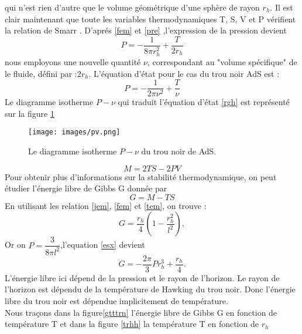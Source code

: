 \documentclass[12pt,  a4paper, openright]{report} %
\begin{document}
qui n’est rien d’autre que le volume géométrique d’une sphère de rayon $r_{h}$. Il est clair
maintenant que toute les variables thermodynamiques T, S, V et P vérifient la relation
de Smarr \cite{16} .
D'aprés \ref{fem} et \ref{pre} ,l'expression de la pression devient 
\begin{equation}
P=-\dfrac{1}{8\pi r_{h}^2}+\dfrac{T}{2r_{h}}
\end{equation}
nous employons une nouvelle quantité $\nu$, correspondant au "volume spécifique" de le fluide, défini par :$ 2r_{h}$. L'équation d'état pour le cas du trou noir AdS est \cite{18}:
\begin{equation}
\label{rgh}
P=-\dfrac{1}{2\pi \nu^2}+\dfrac{T}{\nu}
\end{equation}
Le diagramme isotherme $P-\nu$ qui traduit l'équation d'état \ref{rgh} est représenté  sur la figure \ref{pv}
\begin{figure}
	\begin{center}
	\texttt{[image: images/pv.png]}
	
	\caption{Le diagramme isotherme $P-\nu$ du trou noir de AdS. }
	\label{pv}
	\end{center}
	
\end{figure}

\begin{equation}
M=2TS-2PV
\end{equation}
Pour obtenir plus d'informations sur la stabilité thermodynamique, on peut étudier l'énergie libre de Gibbs G donnée par
\begin{equation}
G=M-TS
\end{equation}
En utilisant les relation \ref{jem}, \ref{fem} et \ref{tem}, on trouve :
\begin{equation}
\label{esx}
G=\dfrac{r_{h}}{4}(1-\dfrac{r_{h}^{2}}{l^{2}}),
\end{equation}
Or on $P=\dfrac{3}{8\pi l^{2}}$,l'equation \ref{esx} devient
\begin{equation}
G=-\dfrac{2\pi}{3}Pr_{h}^{3}+\dfrac{r_{h}}{4}.
\end{equation}
L’énergie libre ici dépend de la pression et le rayon de l’horizon. Le rayon de l’horizon est
dépendu de la température de Hawking du trou noir. Donc l’énergie libre du trou noir est
dépendue implicitement de température.\\
 Nous traçons dans la figure\ref{gtttrn} l’énergie libre de Gibbs G en fonction de température T et dans la figure \ref{trhh} la température T en fonction de $r_{h}$
 
\end{document}
